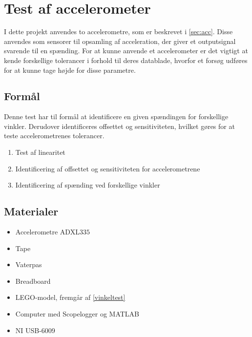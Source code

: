 \section{Test af accelerometer} 
\label{sec:test_acc}
I dette projekt anvendes to accelerometre, som er beskrevet i \autoref{sec:acc}. Disse anvendes som sensorer til opsamling af acceleration, der giver et outputsignal svarende til en spænding. For at kunne anvende et accelerometer er det vigtigt at kende forskellige tolerancer i forhold til deres datablade, hvorfor et forsøg udføres for at kunne tage højde for disse parametre.

\subsection{Formål}
Denne test har til formål at identificere en given spændingen for forskellige vinkler. Derudover identificeres %
offsettet og sensitiviteten, hvilket gøres for at teste accelerometrenes tolerancer.

\begin{enumerate}
\item Test af linearitet
\item Identificering af offsettet og sensitiviteten for accelerometrene
\item Identificering af spænding ved forskellige vinkler
\end{enumerate}

\subsection{Materialer}
\begin{itemize}
\item Accelerometre ADXL$335$
\item Tape
\item Vaterpas
\item Breadboard
\item LEGO-model, fremgår af \autoref{vinkeltest}
\item Computer med Scopelogger og MATLAB
\item NI USB-6009
\end{itemize}

